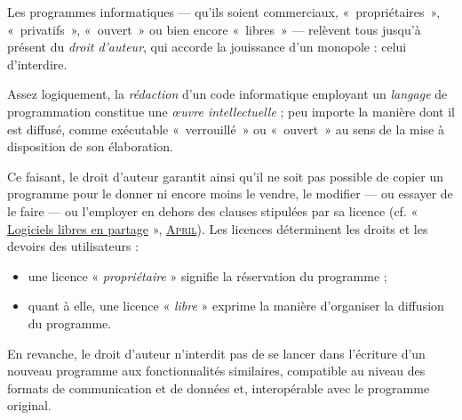 
Les programmes informatiques --- qu'ils soient commerciaux, «~propriétaires~», «~privatifs~», «~ouvert~» ou bien encore «~libres~» --- relèvent tous jusqu'à présent
du \emph{droit d'auteur}, qui accorde la jouissance d'un monopole : celui d'interdire.

Assez logiquement, la \emph{rédaction} d'un code informatique employant un \emph{langage} de programmation constitue une \emph{œuvre intellectuelle} ; peu importe la manière dont il est diffusé, comme exécutable «~verrouillé~» ou «~ouvert~» au sens de la mise à disposition de son élaboration.

Ce faisant, le droit d'auteur garantit ainsi qu'il ne soit pas possible de copier un programme pour le donner ni encore moins le vendre, le modifier --- ou essayer de le faire --- ou l'employer en dehors des clauses stipulées par sa licence (cf. « \href{./Documents/Chapter01/april-carrefour-numerique-2006-05-02.pdf}{Logiciels libres en partage} », \href{https://www.april.org/files/documents/20060502-carrefour-numerique.pdf}{\textsc{April}}).
Les licences déterminent les droits et les devoirs des utilisateurs :
\begin{itemize}
	\item une licence « \emph{propriétaire} » signifie la réservation du programme ;
	\item quant à elle, une licence « \emph{libre} » exprime la manière d'organiser la diffusion du programme.
\end{itemize}

En revanche, le droit d'auteur n'interdit pas de se lancer dans l'écriture d'un nouveau programme aux fonctionnalités similaires, compatible au niveau des formats de communication et de données et, interopérable avec le programme original.

